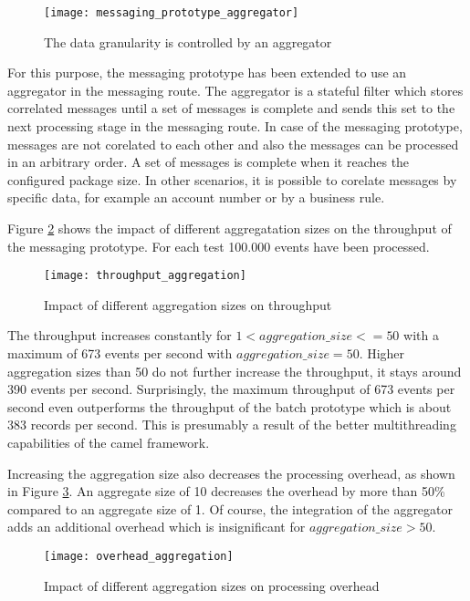 \begin{figure}[htbp]
	\centering
	\texttt{[image: messaging\_prototype\_aggregator]}
	\caption{The data granularity is controlled by an aggregator}
	\label{fig:ch4_messaging_prototype_aggregator}
\end{figure}

For this purpose, the messaging prototype has been extended to use an aggregator in the messaging route. The aggregator is a stateful filter which stores correlated messages until a set of messages is complete and sends this set to the next processing stage in the messaging route. In case of the messaging prototype, messages are not corelated to each other and also the messages can be processed in an arbitrary order. A set of messages is complete when it reaches the configured package size. In other scenarios, it is possible to corelate messages by specific data, for example an account number or by a business rule.

Figure \ref{fig:ch4_throughput_aggregation} shows the impact of different aggregatation sizes on the throughput of the messaging prototype. For each test 100.000 events have been processed.
\begin{figure}[htbp]
	\centering
	\texttt{[image: throughput\_aggregation]}
	\caption{Impact of different aggregation sizes on throughput}
	\label{fig:ch4_throughput_aggregation}
\end{figure}
The throughput increases constantly for $1<aggregation\_size<=50$ with a maximum of 673 events per second with $aggregation\_size=50$. Higher aggregation sizes than 50 do not further increase the throughput, it stays around 390 events per second. Surprisingly, the maximum throughput of 673 events per second even outperforms the throughput of the batch prototype which is about 383 records per second. This is presumably a result of the better multithreading capabilities of the camel framework.

Increasing the aggregation size also decreases the processing overhead, as shown in Figure \ref{fig:ch4_overhead_aggregation}. An aggregate size of 10 decreases the overhead by more than 50\% compared to an aggregate size of 1. Of course, the integration of the aggregator adds an additional overhead which is insignificant for $aggregation\_size>50$.
\begin{figure}[htbp]
	\centering
	\texttt{[image: overhead\_aggregation]}
	\caption{Impact of different aggregation sizes on processing overhead}
	\label{fig:ch4_overhead_aggregation}
\end{figure}

